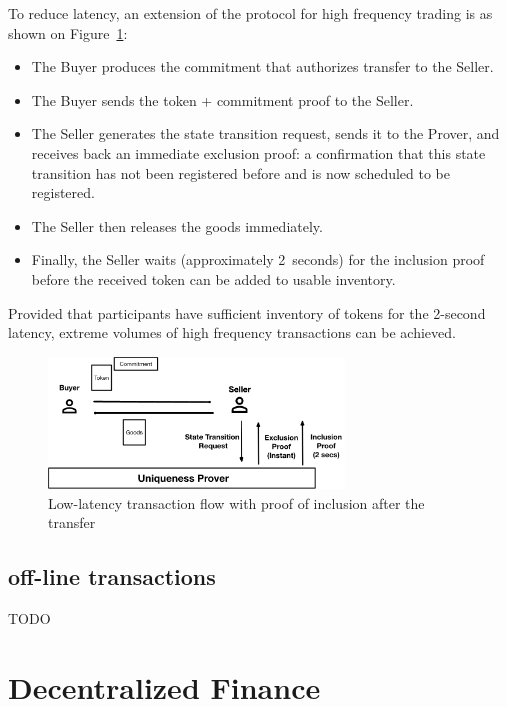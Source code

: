 \documentclass{article}
\begin{document}
To reduce latency, an extension of the protocol for high frequency trading is as shown on Figure~\ref{fig:LowLatency2}:
\begin{itemize}
  \item The Buyer produces the commitment that authorizes transfer to the Seller.
  \item The Buyer sends the token + commitment proof to the Seller.
  \item The Seller generates the state transition request, sends it to the Prover, and receives back an immediate exclusion proof: a confirmation that this state transition has not been registered before and is now scheduled to be registered.
  \item The Seller then releases the goods immediately.
  \item Finally, the Seller waits (approximately 2~seconds) for the inclusion proof before the received token can be added to usable inventory.
\end{itemize}

Provided that participants have sufficient inventory of tokens for the 2-second latency, extreme volumes of high frequency transactions can be achieved.

\begin{figure}[ht]
    \centering
    \includegraphics[width=0.7\textwidth]{LowLatency2.png}
    \caption{Low-latency transaction flow with proof of inclusion after the transfer}
    \label{fig:LowLatency2}
\end{figure}


\subsection{off-line transactions}
TODO

\section{Decentralized Finance}
\end{document}
